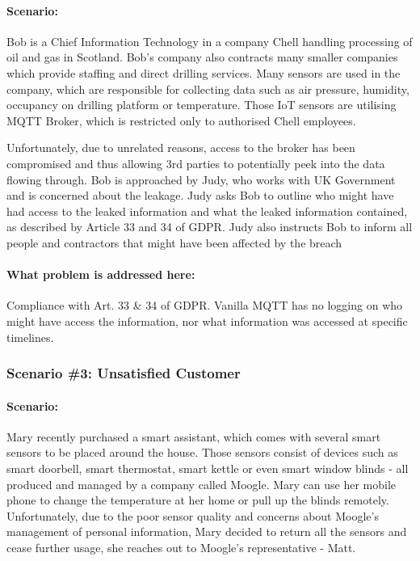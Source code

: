 \paragraph{\textbf{Scenario:}}
Bob is a Chief Information Technology in a company Chell handling processing of oil and gas in Scotland. Bob's company also contracts many smaller companies which provide staffing and direct drilling services. Many sensors are used in the company, which are responsible for collecting data such as air pressure, humidity, occupancy on drilling platform or temperature. Those IoT sensors are utilising MQTT Broker, which is restricted only to authorised Chell employees.

Unfortunately, due to unrelated reasons, access to the broker has been compromised and thus allowing 3rd parties to potentially peek into the data flowing through. Bob is approached by Judy, who works with UK Government and is concerned about the leakage. Judy asks Bob to outline who might have had access to the leaked information and what the leaked information contained, as described by Article 33 and 34 of GDPR. Judy also instructs Bob to inform all people and contractors that might have been affected by the breach
\paragraph{\textbf{What problem is addressed here:}}
Compliance with Art. 33 \& 34 of GDPR. Vanilla MQTT has no logging on who might have access the information, nor what information was accessed at specific timelines.
\subsubsection{\textbf{Scenario \#3: Unsatisfied Customer}}
\paragraph{\textbf{Scenario:}}
Mary recently purchased a smart assistant, which comes with several smart sensors to be placed around the house. Those sensors consist of devices such as smart doorbell, smart thermostat, smart kettle or even smart window blinds - all produced and managed by a company called Moogle. Mary can use her mobile phone to change the temperature at her home or pull up the blinds remotely. Unfortunately, due to the poor sensor quality and concerns about Moogle's management of personal information, Mary decided to return all the sensors and cease further usage, she reaches out to Moogle's representative - Matt.

